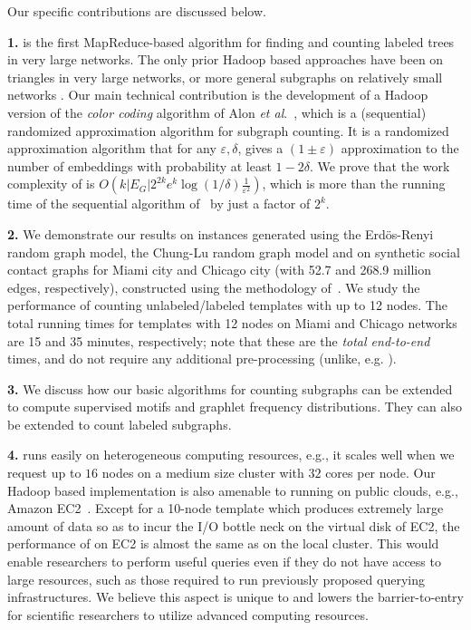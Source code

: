 Our specific contributions are discussed below.



\smallskip
\textbf{1.} \sahad{} is the first MapReduce-based algorithm for finding and
counting labeled trees in very large networks.
The only prior Hadoop based approaches have been on triangles
\cite{tsourakakis2009doulion, pagh2011colorful, suri2011counting} in very large
networks, or more general subgraphs on relatively small networks
\cite{liu2009mapreduce}. Our main technical contribution is the development of a
Hadoop version of the \emph{color coding}
algorithm of Alon \emph{et al}.~\cite{alon2008biomolecular, alon1995color}, which
is a (sequential) randomized approximation algorithm for subgraph counting.
It is a randomized approximation algorithm that for any $\varepsilon, \delta$,
gives a $(1\pm\varepsilon)$ approximation to the number of embeddings with
probability at least $1-2\delta$.
We prove that the work complexity of \sahad{} is
$O(k|E_G|2^{2k}e^k\log{(1/\delta)}\frac{1}{\varepsilon^2})$, which is more than
the running time of the sequential algorithm of~\cite{alon2008biomolecular}
by just a factor of $2^k$.

\smallskip
\textbf{2.} We demonstrate our results on instances generated using the Erd\"{o}s-Renyi
random graph model, the Chung-Lu random graph model
and on synthetic social contact graphs for Miami city and Chicago city
(with 52.7 and 268.9 million edges, respectively), constructed using
the methodology of~\cite{barrett2009generation}. We study the performance of
counting unlabeled/labeled templates with up to 12 nodes. The total running
times for templates with 12 nodes on Miami and Chicago networks are 15 and 35
minutes, respectively; note that these are the \emph{total end-to-end} times,
and do not require any additional pre-processing (unlike, e.g.
\cite{brocheler2010cosi}).


\smallskip
\textbf{3.} We discuss how our basic algorithms for counting subgraphs can
be extended to compute supervised motifs and graphlet frequency distributions.
They can also be extended to count labeled subgraphs.

\smallskip
\textbf{4.} \sahad{} runs easily on heterogeneous computing resources, e.g., it
scales well when we request up to $16$ nodes on a medium size cluster with $32$
cores per node. Our Hadoop based implementation is also amenable to running on
public clouds, e.g., Amazon EC2~\cite{Web:Amazon-EC2}. Except for a 10-node
template which produces extremely large amount of data so as to incur the I/O
bottle neck on the virtual disk of EC2, the performance of \sahad{} on
EC2 is almost the same as on the local cluster. This would enable researchers
to perform useful queries even if they do not have access to large resources,
such as those required to run previously proposed querying infrastructures. We
believe this aspect is unique to \sahad{} and lowers the barrier-to-entry
for scientific researchers to utilize advanced computing resources.

